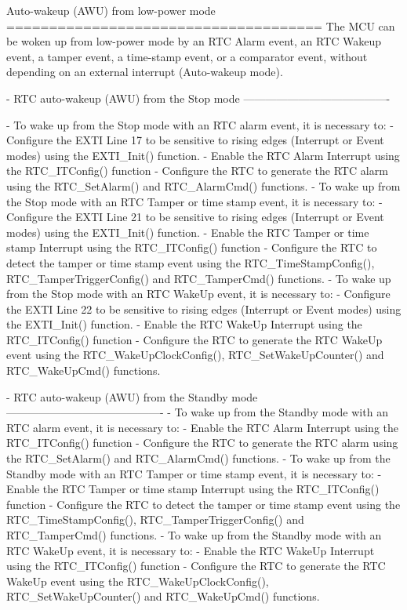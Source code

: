 \begin{DoxyVerb}
   Auto-wakeup (AWU) from low-power mode
   =====================================
   The MCU can be woken up from low-power mode by an RTC Alarm event, an RTC 
   Wakeup event, a tamper event, a time-stamp event, or a comparator event, 
   without depending on an external interrupt (Auto-wakeup mode).

   - RTC auto-wakeup (AWU) from the Stop mode
     ----------------------------------------
     
     - To wake up from the Stop mode with an RTC alarm event, it is necessary to:
       - Configure the EXTI Line 17 to be sensitive to rising edges (Interrupt 
         or Event modes) using the EXTI_Init() function.
       - Enable the RTC Alarm Interrupt using the RTC_ITConfig() function
       - Configure the RTC to generate the RTC alarm using the RTC_SetAlarm() 
         and RTC_AlarmCmd() functions.
     - To wake up from the Stop mode with an RTC Tamper or time stamp event, it 
       is necessary to:
       - Configure the EXTI Line 21 to be sensitive to rising edges (Interrupt 
         or Event modes) using the EXTI_Init() function.
       - Enable the RTC Tamper or time stamp Interrupt using the RTC_ITConfig() 
         function
       - Configure the RTC to detect the tamper or time stamp event using the
         RTC_TimeStampConfig(), RTC_TamperTriggerConfig() and RTC_TamperCmd()
         functions.
     - To wake up from the Stop mode with an RTC WakeUp event, it is necessary to:
       - Configure the EXTI Line 22 to be sensitive to rising edges (Interrupt 
         or Event modes) using the EXTI_Init() function.
       - Enable the RTC WakeUp Interrupt using the RTC_ITConfig() function
       - Configure the RTC to generate the RTC WakeUp event using the RTC_WakeUpClockConfig(), 
         RTC_SetWakeUpCounter() and RTC_WakeUpCmd() functions.

   - RTC auto-wakeup (AWU) from the Standby mode
     -------------------------------------------
     - To wake up from the Standby mode with an RTC alarm event, it is necessary to:
       - Enable the RTC Alarm Interrupt using the RTC_ITConfig() function
       - Configure the RTC to generate the RTC alarm using the RTC_SetAlarm() 
         and RTC_AlarmCmd() functions.
     - To wake up from the Standby mode with an RTC Tamper or time stamp event, it 
       is necessary to:
       - Enable the RTC Tamper or time stamp Interrupt using the RTC_ITConfig() 
         function
       - Configure the RTC to detect the tamper or time stamp event using the
         RTC_TimeStampConfig(), RTC_TamperTriggerConfig() and RTC_TamperCmd()
         functions.
     - To wake up from the Standby mode with an RTC WakeUp event, it is necessary to:
       - Enable the RTC WakeUp Interrupt using the RTC_ITConfig() function
       - Configure the RTC to generate the RTC WakeUp event using the RTC_WakeUpClockConfig(), 
         RTC_SetWakeUpCounter() and RTC_WakeUpCmd() functions.\end{DoxyVerb}
 

